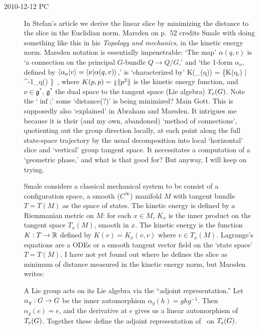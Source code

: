 \begin{description}
\item[2010-12-12 PC]
													\toCB
In  Stefan's article we derive the linear slice by minimizing
the distance to the slice in the Euclidian norm. Marsden on
p.~52 credits Smale with doing something
like this in his
{\emph{Topology and mechanics}}, in the kinetic energy norm.
Marsden notation is essentially
impenetrable:
`The map' $\alpha(q,v)$ is `a connection on the principal $G$-bundle $Q
\to Q/G$,' and `the 1-form $\alpha_\nu$, defined by
$\braket{\alpha_\nu}{v} = \braket{\nu}{\alpha(q,v)}$,'
is `characterized by'
\beq
K(\alpha_\nu(q))
= \inf \left\{K(q,\beta) \;|\; \beta \in {}^{-1}_q(\nu) \right\}
\,,
where $K(p,p) = {\scriptstyle{1\over2}} \| p^2 \|$ is the kinetic energy function,
and $\nu \in \mathfrak{g}^*$, $\mathfrak{g}^*$ the dual space to
the tangent space (Lie algebra) $T_e(G)$.
Note the `$\inf$;' some `distance(?)' is being minimized? Main Gott.
This is supposedly also `explained' in Abraham and Marsden.
It intrigues me because it is their (and my own, abandoned) `method of
connections', quotienting out the group direction locally, at each point
along the full state-space trajectory by the usual decomposition into
local `horizontal' slice and `vertical' group tangent space. It
necessitates a computation of a `geometric phase,' and what is that good for?
But anyway, I will keep on trying.



Smale considers a classical mechanical system to be consist of a
configuration space, a smooth ($C^\infty$) manifold $M$ with tangent
bundle $T=T(M)$ as the space of states. The kinetic energy is defined by
a Riemmanian metric on $M$: for each $x\in M$, $K_x$ is the inner product
on the tangent space $T_x(M)$, smooth in $x$. The kinetic energy is the
function $K : T \to \mathbb{R}$ defined by $K(v) = K_x(v,v)$ where $v \in
T_x(M)$. Lagrange's equations are a ODEs or a smooth tangent vector field
on the `state space' $T=T(M)$. I have not yet found out where he defines the slice
as minimum of distance measured in the kinetic energy norm, but
Marsden writes:


													\toCB
A Lie group acts on its Lie algebra via the ``adjoint representation.''
Let $\alpha_g : G \to G$ be the inner automorphism $\alpha_g(h)
= gh g^{-1}$. Then $\alpha_g(e) = e$, and the derivative at $e$ gives us
a linear automorphism of $T_e(G)$. Together these define the adjoint
representation of \Group\ on $T_e(G)$.



\end{description}
